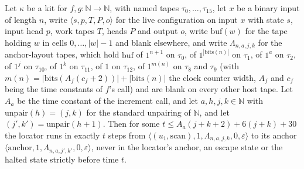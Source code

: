 \begin{theorem}
\label{Turing.NTimeDiag.qy_rnd_pair}
\leanok
{}
Let $\kappa$ be a kit for $f, g : \mathbb{N} \to \mathbb{N}$, with named tapes $\tau_0, \dots,
\tau_{15}$, let $x$ be a binary input of length $n$, write $\langle s, p, T, P, o\rangle$ for the
live configuration on input $x$ with state $s$, input head $p$, work tapes $T$, heads $P$ and
output $o$, write $\mathrm{buf}(w)$ for the tape holding $w$ in cells $0, \dots, |w| - 1$ and blank
elsewhere, and write $\Lambda_{n,a,j,k}$ for the anchor-layout tapes, which hold $\mathrm{buf}$ of
$1^{n+1}$ on $\tau_0$, of $1^{|\mathrm{bits}(n)|}$ on $\tau_1$, of $1^a$ on $\tau_2$, of $1^j$ on
$\tau_{10}$, of $1^k$ on $\tau_{11}$, of $1$ on $\tau_{12}$, of $1^{m(n)}$ on $\tau_8$ and $\tau_9$
(with $m(n) = |\mathrm{bits}(A_f(c_f + 2))| + |\mathrm{bits}(n)|$ the clock counter width, $A_f$
and $c_f$ being the time constants of $f$'s call) and are blank on every other host tape. Let $A_a$
be the time constant of the increment call, and let $a, h, j, k \in \mathbb{N}$ with
$\mathrm{unpair}(h) = (j, k)$ for the standard unpairing of $\mathbb{N}$, and let $(j', k') =
\mathrm{unpair}(h + 1)$. Then for some $t \le A_a(j + k + 2) + 6(j + k) + 30$ the locator runs in
exactly $t$ steps from $\langle (u_1, \mathrm{scan}), 1, \Lambda_{n,a,j,k}, 0, \varepsilon\rangle$
to its anchor $\langle \mathrm{anchor}, 1, \Lambda_{n,a,j',k'}, 0, \varepsilon\rangle$, never in
the locator's anchor, an escape state or the halted state strictly before time $t$.
\end{theorem}

